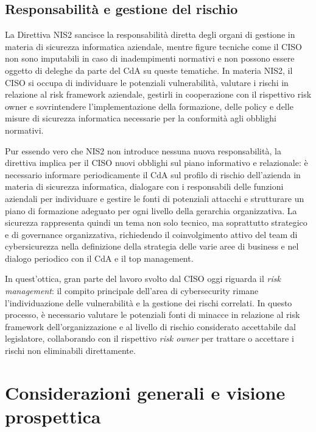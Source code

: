 \subsection{Responsabilità e gestione del rischio}
La Direttiva NIS2 sancisce la responsabilità diretta degli organi di gestione in materia di sicurezza informatica aziendale, mentre figure tecniche come il CISO
non sono imputabili in caso di inadempimenti normativi e non possono essere oggetto di deleghe da parte del CdA su queste tematiche.
In materia NIS2, il CISO si occupa di individuare le potenziali vulnerabilità, valutare i rischi in relazione al risk framework aziendale, gestirli in 
cooperazione con il rispettivo risk owner e sovrintendere l'implementazione della formazione, delle policy e delle misure di sicurezza informatica necessarie
per la conformità agli obblighi normativi. 

Pur essendo vero che NIS2 non introduce nessuna nuova responsabilità, la direttiva implica per il CISO nuovi obblighi sul piano informativo e relazionale:
è necessario informare periodicamente il CdA sul profilo di rischio dell'azienda in materia di sicurezza informatica, dialogare con i responsabili delle 
funzioni aziendali per individuare e gestire le fonti di potenziali attacchi e strutturare un piano di formazione adeguato per ogni livello
della gerarchia organizzativa. La sicurezza rappresenta quindi un tema non solo tecnico, ma soprattutto strategico e di governance organizzativa, richiedendo 
il coinvolgimento attivo del team di cybersicurezza nella definizione della strategia delle varie aree di business e nel dialogo periodico con il CdA e 
il top management.

In quest'ottica, gran parte del lavoro svolto dal CISO oggi riguarda il \textit{risk management}: il compito principale dell'area di cybersecurity rimane
l'individuazione delle vulnerabilità e la gestione dei rischi correlati. In questo processo, è necessario valutare le potenziali fonti di minacce in relazione
al risk framework dell'organizzazione e al livello di rischio considerato accettabile dal legislatore, collaborando con il rispettivo \textit{risk owner} per
trattare o accettare i rischi non eliminabili direttamente.



\section{Considerazioni generali e visione prospettica}
